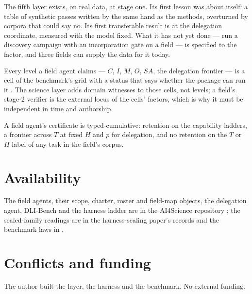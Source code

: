 The fifth layer exists, on real data, at stage one. Its first lesson was about itself: a table of synthetic passes written by the same hand as the methods, overturned by corpora that could say no. Its first transferable result is at the delegation coordinate, measured with the model fixed. What it has not yet done --- run a discovery campaign with an incorporation gate on a field --- is specified to the factor, and three fields can supply the data for it today.

Every level a field agent claims --- $C$, $I$, $M$, $O$, $SA$, the delegation frontier --- is a cell of the benchmark's grid with a status that says whether the package can run it \citep{yang2026hilbenchpaper}. The science layer adds domain witnesses to those cells, not levels; a field's stage-2 verifier is the external locus of the cells' factors, which is why it must be independent in time and authorship.

A field agent's certificate is typed-cumulative: retention on the capability ladders, a frontier across $T$ at fixed $H$ and $p$ for delegation, and no retention on the $T$ or $H$ label of any task in the field's corpus.

\section*{Availability}

The field agents, their scope, charter, roster and field-map objects, the delegation agent, DLI-Bench and the harness ladder are in the AI4Science repository \citep{ai4science2026,ai4science_research_agents}; the sealed-family readings are in the harness-scaling paper's records and the benchmark laws in \citet{yang2026hilbench}.

\section*{Conflicts and funding}

The author built the layer, the harness and the benchmark. No external funding.
